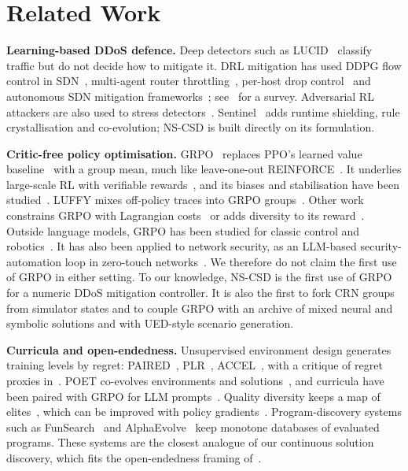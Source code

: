 \section{Related Work}
\textbf{Learning-based DDoS defence.} Deep detectors such as
LUCID~\cite{doriguzzi2020lucid} classify traffic but do not decide how to
mitigate it. DRL mitigation has used DDPG flow control in
SDN~\cite{liu2018drlddos}, multi-agent router throttling~\cite{malialis2015distributed},
per-host drop control~\cite{simpson2020perhost} and autonomous SDN mitigation
frameworks~\cite{akbari2020atmos}; see~\cite{nguyen2023drlcyber} for a survey.
Adversarial RL attackers are also used to stress detectors~\cite{shao2025adados}.
Sentinel~\cite{alfatemi2026sentinel} adds runtime shielding, rule
crystallisation and co-evolution; NS-CSD is built directly on its formulation.

\textbf{Critic-free policy optimisation.} GRPO~\cite{shao2024deepseekmath}
replaces PPO's learned value baseline~\cite{schulman2017ppo,schulman2016gae}
with a group mean, much like leave-one-out REINFORCE~\cite{kool2019buy4,ahmadian2024back}.
It underlies large-scale RL with verifiable rewards~\cite{guo2025deepseekr1},
and its biases and stabilisation have been studied~\cite{yu2025dapo,liu2025understanding,zheng2025gspo}.
LUFFY mixes off-policy traces into GRPO groups~\cite{yan2025luffy}. Other work
constrains GRPO with Lagrangian costs~\cite{girgis2026constrainedgrpo} or adds
diversity to its reward~\cite{li2025darling}. Outside language models, GRPO
has been studied for classic control and robotics~\cite{oliveira2025critics,khanda2025grpocontinuous,wang2026gr2po}.
It has also been applied to network security, as an LLM-based security-automation loop in
zero-touch networks~\cite{cao2025secloop}. We therefore do not claim the first
use of GRPO in either setting. To our knowledge, NS-CSD is the first use of
GRPO for a numeric DDoS mitigation controller. It is also the first to fork
CRN groups from simulator states and to couple GRPO with an archive of mixed
neural and symbolic solutions and with UED-style scenario generation.

\textbf{Curricula and open-endedness.} Unsupervised environment design
generates training levels by regret: PAIRED~\cite{dennis2020paired},
PLR~\cite{jiang2021plr,jiang2021robustplr}, ACCEL~\cite{parkerholder2022accel},
with a critique of regret proxies in~\cite{rutherford2024noregrets}.
POET co-evolves environments and solutions~\cite{wang2019poet}, and
curricula have been paired with GRPO for LLM prompts~\cite{chen2025sec}. Quality
diversity keeps a map of elites~\cite{mouret2015mapelites,pugh2016qd}, which
can be improved with policy gradients~\cite{nilsson2021pgame}. Program-discovery
systems such as FunSearch~\cite{romeraparedes2024funsearch} and
AlphaEvolve~\cite{novikov2025alphaevolve} keep monotone databases of
evaluated programs. These systems are the closest analogue of our continuous
solution discovery, which fits the open-endedness framing
of~\cite{hughes2024openendedness}.

